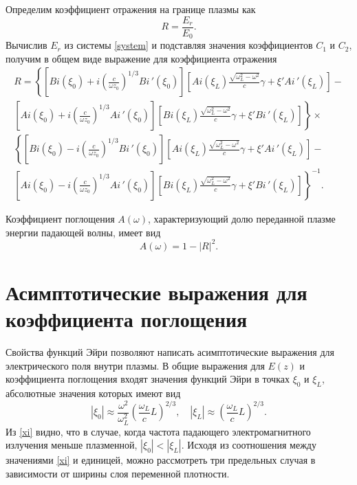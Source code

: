 \documentclass[12pt,a4paper]{article}
\numberwithin{equation}{section}
\begin{document}
Определим коэффициент отражения на границе плазмы как
\begin{equation}
    \label{refl}
    R = \frac{E_r}{E_0}.
\end{equation}
Вычислив $E_r$ из системы \eqref{system} и подставляя значения коэффициентов $C_1$ и $C_2$, получим в общем виде выражение для коэффициента отражения
\begin{equation}
\label{coeff}
\begin{array}{lcl}
  R = \left\{\left[Bi\left(\xi_0\right)+i\left(\frac{c}{\omega z_0}\right)^{1/3}Bi\,'\left(\xi_0\right)\right]\left[Ai\left(\xi_L\right)\frac{\sqrt{\omega_L^2-\omega^2}}{c}\gamma+\xi'Ai\,'\left(\xi_L\right)\right] - \right. \\
  \left.\left[Ai\left(\xi_0\right)+i\left(\frac{c}{\omega z_0}\right)^{1/3}Ai\,'\left(\xi_0\right)\right]\left[Bi\left(\xi_L\right)\frac{\sqrt{\omega_L^2-\omega^2}}{c}\gamma+\xi'Bi\,'\left(\xi_L\right)\right]\right\}\times \\
  \left\{\left[Bi\left(\xi_0\right)-i\left(\frac{c}{\omega z_0}\right)^{1/3}Bi\,'\left(\xi_0\right)\right]\left[Ai\left(\xi_L\right)\frac{\sqrt{\omega_L^2-\omega^2}}{c}\gamma+\xi'Ai\,'\left(\xi_L\right)\right] \right. -\\
   \left.\left[Ai\left(\xi_0\right)-i\left(\frac{c}{\omega z_0}\right)^{1/3}Ai\,'\left(\xi_0\right)\right]\left[Bi\left(\xi_L\right)\frac{\sqrt{\omega_L^2-\omega^2}}{c}\gamma+\xi'Bi\,'\left(\xi_L\right)\right]\right\}^{-1}.
\end{array}
\end{equation}

Коэффициент поглощения $A\left(\omega\right)$, характеризующий долю переданной плазме энергии падающей волны, имеет вид
\begin{equation}
    \label{absorp_common}
    A\left(\omega\right) = 1-\left|R\right|^2.
\end{equation}

\section{Асимптотические выражения для коэффициента поглощения}
Свойства функций Эйри позволяют написать асимптотические выражения для электрического поля внутри плазмы. В общие выражения для $E\left(z\right)$ и коэффициента поглощения входят значения функций Эйри в точках $\xi_0$ и $\xi_L$, абсолютные значения которых имеют вид
\begin{equation}
\label{xi}
    |\xi_0|\approx \frac{\omega^2}{\omega_L^2}\left(\frac{\omega_L}{c}L\right)^{2/3},\quad |\xi_L|\approx \left(\frac{\omega_L}{c}L\right)^{2/3}.
\end{equation}
Из \eqref{xi} видно, что в случае, когда частота падающего электромагнитного излучения меньше плазменной, $|\xi_0|<|\xi_L|$. Исходя из соотношения между значениями \eqref{xi} и единицей, можно рассмотреть три предельных случая в зависимости от ширины слоя переменной плотности.
\end{document}

